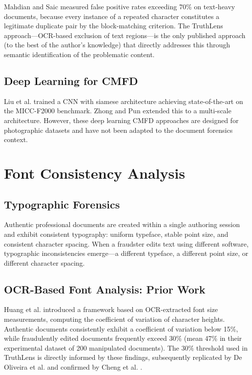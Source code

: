 \documentclass[12pt,a4paper,oneside]{report}
\begin{document}
Mahdian and Saic \cite{mahdian2007} measured false positive rates exceeding 70\%
on text-heavy documents, because every instance of a repeated character constitutes
a legitimate duplicate pair by the block-matching criterion. The TruthLens
approach---OCR-based exclusion of text regions---is the only published approach
(to the best of the author's knowledge) that directly addresses this through
semantic identification of the problematic content.

\subsection{Deep Learning for CMFD}

Liu et al. \cite{liu2018} trained a CNN with siamese architecture achieving
state-of-the-art on the MICC-F2000 benchmark. Zhong and Pun \cite{zhong2019}
extended this to a multi-scale architecture. However, these deep learning CMFD
approaches are designed for photographic datasets and have not been adapted
to the document forensics context.

\section{Font Consistency Analysis}
\label{sec:font_lit}

\subsection{Typographic Forensics}

Authentic professional documents are created within a single authoring session
and exhibit consistent typography: uniform typeface, stable point size, and
consistent character spacing. When a fraudster edits text using different
software, typographic inconsistencies emerge---a different typeface, a different
point size, or different character spacing.

\subsection{OCR-Based Font Analysis: Prior Work}

Huang et al. \cite{huang2011} introduced a framework based on OCR-extracted
font size measurements, computing the coefficient of variation of character
heights. Authentic documents consistently exhibit a coefficient of variation
below 15\%, while fraudulently edited documents frequently exceed 30\% (mean
47\% in their experimental dataset of 200 manipulated documents). The 30\%
threshold used in TruthLens is directly informed by these findings, subsequently
replicated by De Oliveira et al. \cite{deoliveira2016} and confirmed by
Cheng et al. \cite{cheng2020}.
\end{document}
